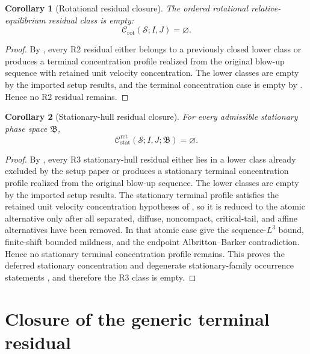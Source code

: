 \documentclass[11pt]{amsart}
\numberwithin{equation}{section}
\theoremstyle{plain}
\newtheorem{corollary}[corollary]{Corollary}
\theoremstyle{definition}
\theoremstyle{remark}
\newcommand{\Crot}{\mathcal C_{\mathrm{rot}}}
\newcommand{\Cstat}{\mathcal C_{\mathrm{stat}}^{\mathrm{ret}}}
\begin{document}
\begin{corollary}[Rotational residual closure]
\label{cor:R2-closure}
The ordered rotational relative-equilibrium residual class is empty:
\[
   \Crot(\mathcal S;I,J)=\varnothing .
\]
\end{corollary}

\begin{proof}
By , every R2 residual either belongs to a
previously closed lower class or produces a terminal concentration profile
realized from the original blow-up sequence with retained unit velocity concentration.
The lower classes are empty by the imported setup results, and the terminal
concentration case is empty by
.  Hence no R2 residual remains.
\end{proof}

\begin{corollary}[Stationary-hull residual closure]
\label{cor:R3-closure}
For every admissible stationary phase space \(\mathfrak B\),
\[
   \Cstat(\mathcal S;I,J;\mathfrak B)=\varnothing .
\]
\end{corollary}

\begin{proof}
By
, every R3
stationary-hull residual either lies in a lower class already excluded by the setup paper or produces
a stationary terminal concentration profile realized from the original blow-up
sequence.  The lower classes are empty by the imported setup results.  The stationary terminal
profile satisfies the retained unit velocity concentration hypotheses of
, so it is reduced to the atomic alternative
only after all separated, diffuse, noncompact, critical-tail, and affine
alternatives have been removed.  In that atomic case
give the sequence-\(L^3\) bound, finite-shift bounded mildness, and the endpoint
Albritton--Barker contradiction.  Hence no stationary terminal concentration
profile remains.  This proves the deferred stationary concentration and
degenerate stationary-family occurrence statements
,
and therefore the R3 class is empty.
\end{proof}

\section{Closure of the generic terminal residual}
\label{sec:R4-closure}
\end{document}
